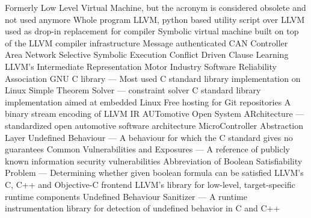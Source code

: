   {Formerly Low Level Virtual Machine, but the acronym is
               considered obsolete and not used anymore}
 {Whole program LLVM, python based utility script over LLVM used
               as drop-in replacement for compiler}
  {Symbolic virtual machine built on top of the LLVM compiler
               infrastructure}
 {Message authenticated CAN}
 {Controller Area Network}
 {Selective Symbolic Execution}
 {Conflict Driven Clause Learning}
 {LLVM's Intermediate Representation}
 {Motor Industry Software Reliability Association}
 {GNU C library --- Most used C standard library implementation on
               Linux}
 {Simple Theorem Solver --- constraint solver}
 {C standard library implementation aimed at embedded Linux}
 {Free hosting for Git repositories}
 {A binary stream encoding of LLVM IR}
 {AUTomotive Open System ARchitecture --- standardized open
                 automotive software architecture}
 {MicroController Abstraction Layer}
 {Undefined Behaviour --- A behaviour for which the C standard gives
            no guarantees}
 {Common Vulnerabilities and Exposures --- A reference of publicly
             known information security vulnerabilities}
 {Abbreviation of Boolean Satisfiability Problem --- Determining
             whether given boolean formula can be satisfied}
 {LLVM's C, C++ and Objective-C frontend}
 {LLVM's library for low-level, target-specific runtime
                     components}
 {Undefined Behaviour Sanitizer --- A runtime instrumentation library
               for detection of undefined behavior in C and C++}
